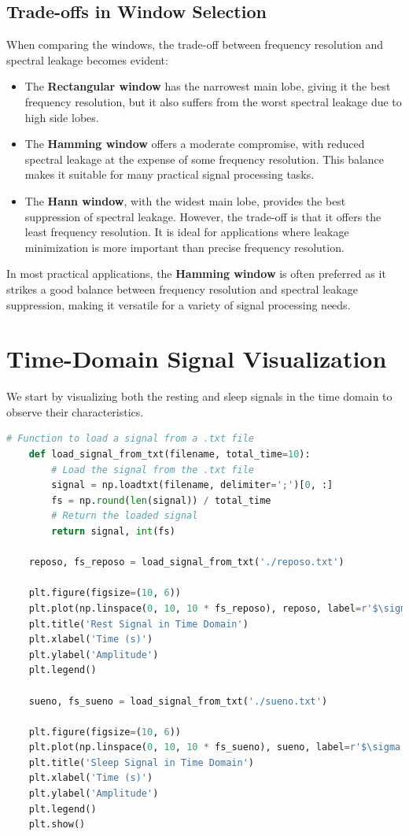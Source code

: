 \documentclass[10pt]{article}
\theoremstyle{definition}
\theoremstyle{remark}
\theoremstyle{definition}
\numberwithin{equation}{prob}
\begin{document}
\subsection{Trade-offs in Window Selection}
When comparing the windows, the trade-off between frequency resolution and spectral leakage becomes evident:

\begin{itemize}
    \item The \textbf{Rectangular window} has the narrowest main lobe, giving it the best frequency resolution, but it also suffers from the worst spectral leakage due to high side lobes.
    
    \item The \textbf{Hamming window} offers a moderate compromise, with reduced spectral leakage at the expense of some frequency resolution. This balance makes it suitable for many practical signal processing tasks.
    
    \item The \textbf{Hann window}, with the widest main lobe, provides the best suppression of spectral leakage. However, the trade-off is that it offers the least frequency resolution. It is ideal for applications where leakage minimization is more important than precise frequency resolution.
\end{itemize}

In most practical applications, the \textbf{Hamming window} is often preferred as it strikes a good balance between frequency resolution and spectral leakage suppression, making it versatile for a variety of signal processing needs.

\section{Time-Domain Signal Visualization}

We start by visualizing both the resting and sleep signals in the time domain to observe their characteristics.

\begin{lstlisting}[language=Python]
	# Function to load a signal from a .txt file
	def load_signal_from_txt(filename, total_time=10):
		# Load the signal from the .txt file
		signal = np.loadtxt(filename, delimiter=';')[0, :]
		fs = np.round(len(signal)) / total_time
		# Return the loaded signal
		return signal, int(fs)

	reposo, fs_reposo = load_signal_from_txt('./reposo.txt')

	plt.figure(figsize=(10, 6))
	plt.plot(np.linspace(0, 10, 10 * fs_reposo), reposo, label=r'$\sigma = 1$')
	plt.title('Rest Signal in Time Domain')
	plt.xlabel('Time (s)')
	plt.ylabel('Amplitude')
	plt.legend()

	sueno, fs_sueno = load_signal_from_txt('./sueno.txt')

	plt.figure(figsize=(10, 6))
	plt.plot(np.linspace(0, 10, 10 * fs_sueno), sueno, label=r'$\sigma = 1$')
	plt.title('Sleep Signal in Time Domain')
	plt.xlabel('Time (s)')
	plt.ylabel('Amplitude')
	plt.legend()
	plt.show()
\end{lstlisting}
\end{document}
